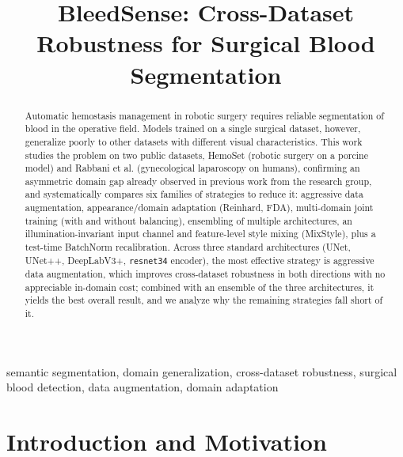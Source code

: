 \documentclass[10pt,conference]{IEEEtran}
\begin{document}
\title{BleedSense: Cross-Dataset Robustness for Surgical Blood Segmentation}

\author{
}

\maketitle

\begin{abstract}
Automatic hemostasis management in robotic surgery requires reliable segmentation of blood in the operative field. Models trained on a single surgical dataset, however, generalize poorly to other datasets with different visual characteristics. This work studies the problem on two public datasets, HemoSet (robotic surgery on a porcine model) and Rabbani et al. (gynecological laparoscopy on humans), confirming an asymmetric domain gap already observed in previous work from the research group, and systematically compares six families of strategies to reduce it: aggressive data augmentation, appearance/domain adaptation (Reinhard, FDA), multi-domain joint training (with and without balancing), ensembling of multiple architectures, an illumination-invariant input channel and feature-level style mixing (MixStyle), plus a test-time BatchNorm recalibration. Across three standard architectures (UNet, UNet++, DeepLabV3+, \texttt{resnet34} encoder), the most effective strategy is aggressive data augmentation, which improves cross-dataset robustness in both directions with no appreciable in-domain cost; combined with an ensemble of the three architectures, it yields the best overall result, and we analyze why the remaining strategies fall short of it.
\end{abstract}

\begin{IEEEkeywords}
semantic segmentation, domain generalization, cross-dataset robustness, surgical blood detection, data augmentation, domain adaptation
\end{IEEEkeywords}

\section{Introduction and Motivation}
\label{sec:intro}
\end{document}
